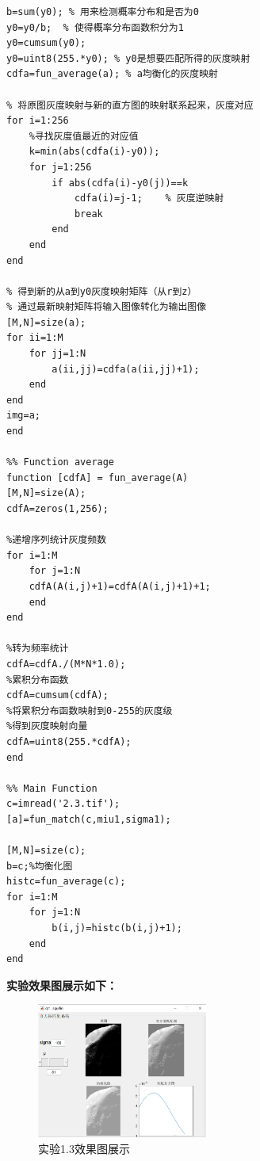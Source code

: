 \documentclass{ctexart}
\begin{document}
\begin{itemize}
\begin{itemize}
\begin{lstlisting}
b=sum(y0); % 用来检测概率分布和是否为0
y0=y0/b;  % 使得概率分布函数积分为1
y0=cumsum(y0);
y0=uint8(255.*y0); % y0是想要匹配所得的灰度映射 
cdfa=fun_average(a); % a均衡化的灰度映射

% 将原图灰度映射与新的直方图的映射联系起来，灰度对应
for i=1:256
    %寻找灰度值最近的对应值
    k=min(abs(cdfa(i)-y0));
    for j=1:256
        if abs(cdfa(i)-y0(j))==k
            cdfa(i)=j-1;    % 灰度逆映射
            break
        end
    end
end

% 得到新的从a到y0灰度映射矩阵（从r到z）
% 通过最新映射矩阵将输入图像转化为输出图像
[M,N]=size(a);
for ii=1:M
    for jj=1:N
        a(ii,jj)=cdfa(a(ii,jj)+1);  
    end  
end 
img=a;
end

%% Function average
function [cdfA] = fun_average(A)
[M,N]=size(A);
cdfA=zeros(1,256);

%递增序列统计灰度频数
for i=1:M
    for j=1:N  
    cdfA(A(i,j)+1)=cdfA(A(i,j)+1)+1;  
    end  
end  

%转为频率统计
cdfA=cdfA./(M*N*1.0);
%累积分布函数
cdfA=cumsum(cdfA);  
%将累积分布函数映射到0-255的灰度级
%得到灰度映射向量
cdfA=uint8(255.*cdfA); 
end

%% Main Function
c=imread('2.3.tif');
[a]=fun_match(c,miu1,sigma1); 

[M,N]=size(c);
b=c;%均衡化图
histc=fun_average(c);
for i=1:M
    for j=1:N
        b(i,j)=histc(b(i,j)+1);  
    end  
end
\end{lstlisting}

\textbf{实验效果图展示如下：}
\begin{figure}[htb]
\centering
\includegraphics[width=0.5\textwidth]{1_3.png}
\caption{实验1.3效果图展示}
\end{figure}


\end{itemize}
\end{itemize}
\end{document}
